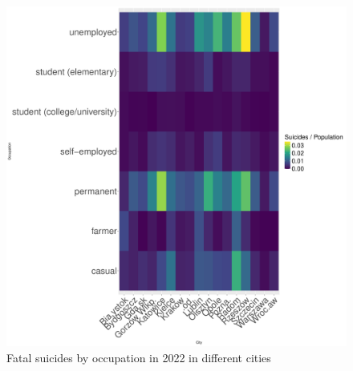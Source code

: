 \documentclass{article}
\begin{document}
\begin{figure}[H]
\begin{minipage}{0.45\textwidth}
        \includegraphics[width=\textwidth]{imgs/job_city_op-fat-2022.pdf}
        \caption{Fatal suicides by occupation in 2022 in different cities}
	\label{fig:job_city_op-fat-2022}
    \end{minipage}
\end{figure}



%
%
%
\end{document}
